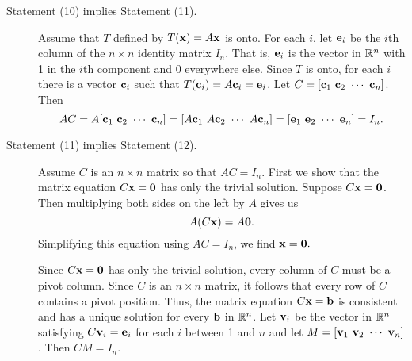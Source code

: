 \begin{description}
\item[Statement (10) implies Statement (11).] Assume that $T$ defined by $T(\mathbf{x}) = A\mathbf{x}$ is onto. For each $i$, let $\mathbf{e}_i$ be the $i$th column of the $n \times n$ identity matrix $I_n$. That is, $\mathbf{e}_i$ is the vector in $\mathbb{R}^n$ with 1 in the $i$th component and 0 everywhere else. Since $T$ is onto, for each $i$ there is a vector $\mathbf{c}_i$ such that $T(\mathbf{c}_i) = A \mathbf{c}_i = \mathbf{e}_i$. Let $C = [\mathbf{c}_1  \ \mathbf{c}_2 \ \cdots \ \mathbf{c}_n]$. Then
\[AC = A[\mathbf{c}_1  \ \mathbf{c}_2 \ \cdots \ \mathbf{c}_n] = [A\mathbf{c}_1 \ A\mathbf{c}_2 \ \cdots \ A\mathbf{c}_n] = [\mathbf{e}_1 \ \mathbf{e}_2 \ \cdots \ \mathbf{e}_n] = I_n.\]
\item[Statement (11) implies Statement (12).] Assume $C$ is an $n \times n$ matrix so that $AC = I_n$. First we show that the matrix equation $C \mathbf{x} = \mathbf{0}$ has only the trivial solution. Suppose $C \mathbf{x} = \mathbf{0}$. Then
multiplying both sides on the left by $A$ gives us
\[A(C \mathbf{x}) = A \mathbf{0}.\]
Simplifying this equation using $AC=I_n$, we find $\mathbf{x} = \mathbf{0}.$

Since $C \mathbf{x} = \mathbf{0}$ has only the trivial solution, every column of $C$ must be a pivot column. Since $C$ is an $n \times n$ matrix, it follows that every row of $C$ contains a pivot position. Thus, the matrix equation $C \mathbf{x} = \mathbf{b}$ is consistent and has a unique solution for every $\mathbf{b}$ in $\mathbb{R}^n$. Let $\mathbf{v}_i$ be the vector in $\mathbb{R}^n$ satisfying $C \mathbf{v}_i = \mathbf{e}_i$ for each $i$ between 1 and $n$ and let $M = [\vv_1 \ \vv_2 \ \cdots \ \vv_n]$. Then $CM = I_n$.


\end{description}
